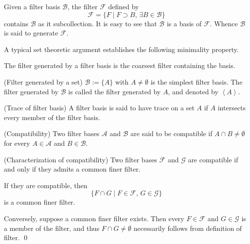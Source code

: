 \documentclass{report}
\begin{document}
\begin{rem}
    Given a filter basis \( \mathscr{B} \), the filter \( \mathscr{F} \) defined by
    \begin{equation*}
        \mathscr{F} = \{F \mid F \supset B,\,\exists B \in \mathscr{B}\}
    \end{equation*}
    contains \( \mathscr{B} \) as it subcollection. It is easy to see that \( \mathscr{B} \) is a basis of \( \mathscr{F} \). Whence \( \mathscr{B} \) is said to generate \( \mathscr{F} \).
\end{rem}

A typical set theoretic argument establishes the following minimality property.
\begin{prp}\label{coarsest generation}
    The filter generated by a filter basis is the coarsest filter containing the basis.
\end{prp}

\begin{ex} (Filter generated by a set)
    \( \mathscr{B}:=\{A\} \) with \( A \neq \emptyset \) is the simplest filter basis. The filter generated by \( \mathscr{B} \) is called the filter generated by \( A \), and denoted by \( \left< A \right> \).
\end{ex}


\begin{dfn} (Trace of filter basis)
    A filter basis is said to have trace on a set \( A \) if \( A \) intersects every member of the filter basis.
\end{dfn}

\begin{dfn} (Compatibility)
    Two filter bases \( \mathscr{A} \) and \( \mathscr{B} \) are said to be compatible if \( A \cap B \neq \emptyset \) for every \( A \in \mathscr{A} \) and \( B \in \mathscr{B} \).
\end{dfn}

\begin{prp}\label{compatible} (Characterization of compatibility)
    Two filter bases \( \mathscr{F} \) and \( \mathscr{G} \) are compatible if and only if they admits a common finer filter.
\end{prp}
\begin{prf}
    If they are compatible, then
    \begin{equation*}
        \{F \cap G \mid F \in \mathscr{F},\,G \in \mathscr{G}\}
    \end{equation*}
    is a common finer filter.

    Conversely, suppose a common finer filter exists. Then every \( F \in \mathscr{F} \) and \( G \in \mathscr{G} \) is a member of the filter, and thus \( F \cap G \neq \emptyset \) necessarily follows from definition of filter.
    \qed\end{prf}
\end{document}
